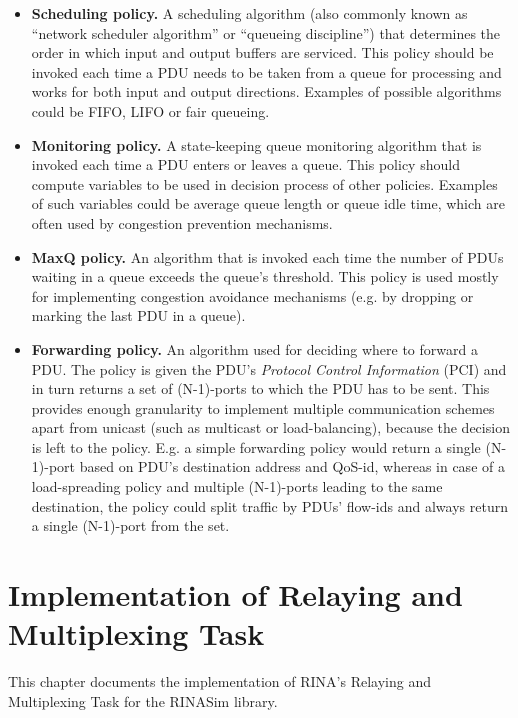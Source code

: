             \begin{itemize}
                \item \textbf{Scheduling policy.} A scheduling algorithm (also commonly known as ``network scheduler algorithm'' or ``queueing discipline'') that determines the order in which input and output buffers are serviced. This policy should be invoked each time a PDU needs to be taken from a queue for processing and works for both input and output directions. Examples of possible algorithms could be FIFO, LIFO or fair queueing.
                \item \textbf{Monitoring policy.} A state-keeping queue monitoring algorithm that is invoked each time a PDU enters or leaves a queue. This policy should compute variables to be used in decision process of other policies. Examples of such variables could be average queue length or queue idle time, which are often used by congestion prevention mechanisms.
                \item \textbf{MaxQ policy.} An algorithm that is invoked each time the number of PDUs waiting in a queue exceeds the queue's threshold. This policy is used mostly for implementing congestion avoidance mechanisms (e.g. by dropping or marking the last PDU in a queue).
                \item \textbf{Forwarding policy.} An algorithm used for deciding where to forward a PDU. The policy is given the PDU's \emph{Protocol Control Information} (PCI) and in turn returns a set of (N-1)-ports to which the PDU has to be sent. This provides enough granularity to implement multiple communication schemes apart from unicast (such as multicast or load-balancing), because the decision is left to the policy. E.g. a simple forwarding policy would return a single (N-1)-port based on PDU's destination address and QoS-id, whereas in case of a load-spreading policy and multiple (N-1)-ports leading to the same destination, the policy could split traffic by PDUs' flow-ids and always return a single (N-1)-port from the set.
            \end{itemize}



\chapter{Implementation of Relaying and Multiplexing Task}\label{implementation}

    This chapter documents the implementation of RINA's Relaying and Multiplexing Task for the RINASim library.


